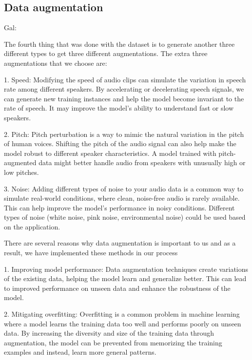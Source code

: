 \documentclass[a4paper]{article}
\begin{document}
\subsection{Data augmentation}

Gal:

The fourth thing that was done with the dataset is to generate another three different types to get three different augmentations. The extra three augmentations that we choose are:\newline


1. Speed: Modifying the speed of audio clips can simulate the variation in speech rate among different speakers. By accelerating or decelerating speech signals, we can generate new training instances and help the model become invariant to the rate of speech. It may improve the model's ability to understand fast or slow speakers.\newline

2. Pitch: Pitch perturbation is a way to mimic the natural variation in the pitch of human voices. Shifting the pitch of the audio signal can also help make the model robust to different speaker characteristics. A model trained with pitch-augmented data might better handle audio from speakers with unusually high or low pitches.\newline

3. Noise: Adding different types of noise to your audio data is a common way to simulate real-world conditions, where clean, noise-free audio is rarely available. This can help improve the model's performance in noisy conditions. Different types of noise (white noise, pink noise, environmental noise) could be used based on the application.\newline


There are several reasons why data augmentation is important to us and as a result, we have implemented these methods in our process\newline

1. Improving model performance: Data augmentation techniques create variations of the existing data, helping the model learn and generalize better. This can lead to improved performance on unseen data and enhance the robustness of the model.\newline

2. Mitigating overfitting: Overfitting is a common problem in machine learning where a model learns the training data too well and performs poorly on unseen data. By increasing the diversity and size of the training data through augmentation, the model can be prevented from memorizing the training examples and instead, learn more general patterns.\newline
\end{document}
